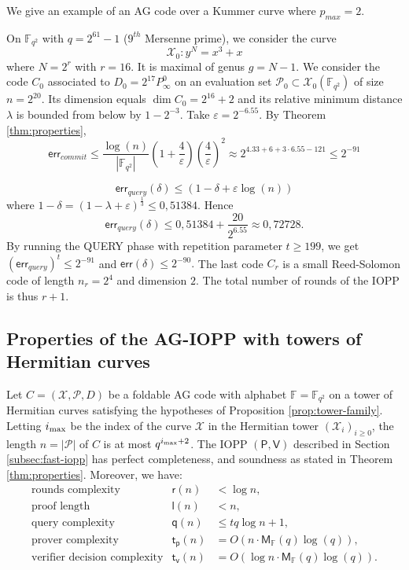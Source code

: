 \documentclass[10pt,a4paper]{article}
\renewcommand\epsilon{\varepsilon}
\newcommand\F{\mathbb{F}}
\newcommand\prover{\mathsf{P}}
\newcommand\verifier{\mathsf{V}}
\newcommand{\size}[1]{\left|#1\right|}
\newcommand\calX{\mathcal{X}}
\newcommand\calP{\mathcal{P}}
\newcommand{\err}{\textsf{err}}
\newcommand{\cd}{\cdot}
\newcommand{\ii}{i_{\rm{max}}}
\theoremstyle{plain}
\theoremstyle{plain}
\theoremstyle{definition}
\theoremstyle{remark}
\theoremstyle{plain}
\begin{document}
We give an example of an AG code over a Kummer curve where $p_{max} = 2$.

\begin{example} On $\F_{q^2}$ with $q=2^{61}-1$ ($9^{th}$ Mersenne prime), we consider the curve
	\[\calX_0 : y^N=x^3+x\]
	where $N=2^{r}$ with $r=16$. It is maximal \cite{TT14} of genus $g=N-1$. We consider the code $C_0$ associated to $D_0= 2^{17} P_\infty^0$ on an evaluation set $\mathcal{P}_0 \subset \calX_0(\F_{q^2})$ of size $n=2^{20}$. Its dimension equals $\dim C_0=2^{16}+2$ and its relative minimum distance $\lambda$ is bounded from below by $1- 2^{-3}$. Take $\epsilon = 2 ^{-6.55}$. By Theorem \ref{thm:properties},
	\[\err_{commit} \leq \frac{\log(n)}{\size{\F_{q^2}}}\left(1+\frac{4}{\epsilon}\right) \left(\frac{4}{\epsilon}\right)^2 \approx 2^{4.33+6+3\cd 6.55 -121} \leq 2^{-91}\]
	
	
	\[\err_{query}(\delta) \leq \left(1-\delta+ \epsilon\log(n)\right)\]
	where $1-\delta=(1-\lambda + \epsilon)^{\frac{1}{3}} \leq 0,51384$. Hence
	\[\err_{query}(\delta) \leq 0,51384+ \frac{20}{2^{6.55}} \approx 0,72728.\]
	By running the \textsf{QUERY} phase with repetition parameter $t \geq 199$, we get $(\err_{query})^t \leq 2^{-91}$ and $\err(\delta)\leq 2^{-90}.$
	The last code $C_r$ is a small Reed-Solomon code of length $n_r = 2^{4}$ and dimension $2$. The total number of rounds of the IOPP is thus $r + 1$.
\end{example}

\subsection{Properties of the AG-IOPP with towers of Hermitian curves}


\begin{theorem}\label{thm:tower-properties}
	Let $C=(\calX, \calP, D)$ be a foldable AG code with alphabet $\F = \F_{q^2}$ on a tower of Hermitian curves satisfying the hypotheses of Proposition \ref{prop:tower-family}. Letting $\ii$ be the index of the curve $\calX$ in the Hermitian tower $(\calX_i)_{i \ge 0}$, the length $n = \size \calP$ of $C$ is at most $q^{\ii + 2}$. 
	The IOPP $(\prover, \verifier)$ described in Section \ref{subsec:fast-iopp} has perfect completeness, and soundness as stated in Theorem \ref{thm:properties}. Moreover, we have:
	\[
	\begin{array}{lll}
		\text{rounds complexity} &\mathsf{r}(n) &< \log n,\\
		\text{proof length} &\mathsf{l}(n) &< n,\\
		\text{query complexity} &\mathsf{q}(n) &\le t q \log n + 1,
		\\
		\text{prover complexity} &\mathsf{t_p}(n) &= O(n \cdot \mathsf{M}_\F(q)\log(q)),\\
		\text{verifier decision complexity} & \mathsf{t_v}(n) &= O(\log n \cdot\mathsf{M}_\F(q)\log(q)).
	\end{array}
	\]
\end{theorem}
\end{document}
